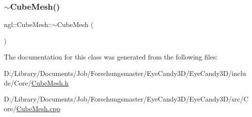 \subsubsection{\texorpdfstring{$\sim$\+Cube\+Mesh()}{~CubeMesh()}}
{\footnotesize\ttfamily ngl\+::\+Cube\+Mesh\+::$\sim$\+Cube\+Mesh (\begin{DoxyParamCaption}{ }\end{DoxyParamCaption})}



The documentation for this class was generated from the following files\+:\begin{DoxyCompactItemize}
\item 
D\+:/\+Library/\+Documents/\+Job/\+Forschungsmaster/\+Eye\+Candy3\+D/\+Eye\+Candy3\+D/include/\+Core/\mbox{\hyperlink{_cube_mesh_8h}{Cube\+Mesh.\+h}}\item 
D\+:/\+Library/\+Documents/\+Job/\+Forschungsmaster/\+Eye\+Candy3\+D/\+Eye\+Candy3\+D/src/\+Core/\mbox{\hyperlink{_cube_mesh_8cpp}{Cube\+Mesh.\+cpp}}\end{DoxyCompactItemize}
